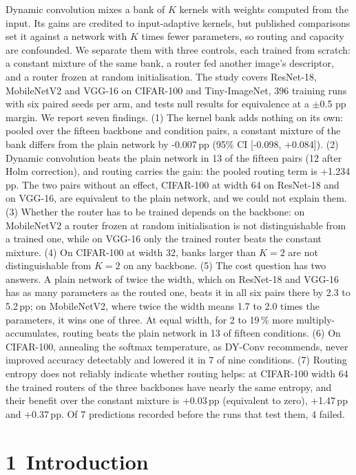 \documentclass{article}
\begin{document}
Dynamic convolution mixes a bank of $K$ kernels with weights computed from
the input. Its gains are credited to input-adaptive kernels, but published
comparisons set it against a network with $K$ times fewer parameters, so
routing and capacity are confounded. We separate them with three controls,
each trained from scratch: a constant mixture of the same bank, a router
fed another image's descriptor, and a router frozen at random
initialisation. The study covers ResNet-18, MobileNetV2 and VGG-16 on
CIFAR-100 and Tiny-ImageNet, 396 training runs with six paired
seeds per arm, and tests null results for equivalence at a
$\pm$0.5 pp margin. We report seven findings. (1) The kernel bank
adds nothing on its own: pooled over the fifteen backbone and condition
pairs, a constant mixture of the bank differs from the plain network by
-0.007\,pp (95\% CI [-0.098, +0.084]).
(2) Dynamic convolution beats the plain network in 13 of the
fifteen pairs (12 after Holm correction), and routing carries
the gain: the pooled routing term is +1.234\,pp. The two pairs
without an effect, CIFAR-100 at width 64 on ResNet-18 and on VGG-16, are
equivalent to the plain network, and we could not explain them. (3)
Whether the router has to be trained depends on the backbone: on
MobileNetV2 a router frozen at random initialisation is not
distinguishable from a trained one, while on VGG-16 only the trained
router beats the constant mixture. (4) On CIFAR-100 at width 32, banks
larger than $K=2$ are not distinguishable from $K=2$ on any backbone. (5)
The cost question has two answers. A plain network of twice the width,
which on ResNet-18 and VGG-16 has as many parameters as the routed one,
beats it in all six pairs there by 2.3 to 5.2\,pp; on
MobileNetV2, where twice the width means 1.7 to 2.0 times
the parameters, it wins one of three. At equal width, for 2 to
19\,\% more multiply-accumulates, routing beats the plain
network in 13 of fifteen conditions. (6) On CIFAR-100, annealing
the softmax temperature, as DY-Conv recommends, never improved accuracy
detectably and lowered it in 7 of nine conditions. (7)
Routing entropy does not reliably indicate whether routing helps: at
CIFAR-100 width 64 the trained routers of the three backbones have nearly
the same entropy, and their benefit over the constant mixture is
+0.03\,pp (equivalent to zero), +1.47\,pp and +0.37\,pp. Of 7 predictions recorded before the
runs that test them, 4 failed.


\section*{1 Introduction}
\end{document}
